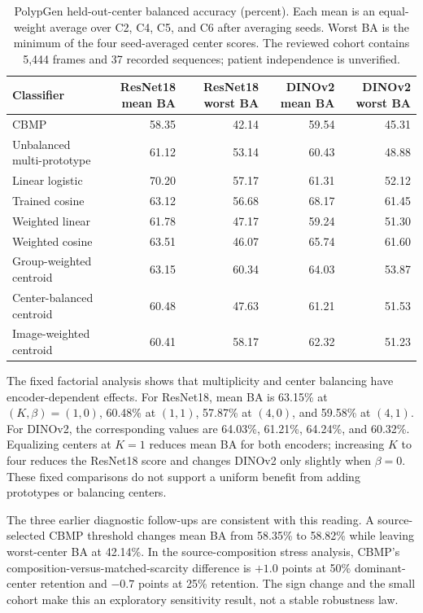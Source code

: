 \begin{table}[t]
\centering\small
\setlength{\tabcolsep}{5pt}
\begin{tabular}{lrrrr}
\hline
Classifier & ResNet18 mean BA & ResNet18 worst BA & DINOv2 mean BA & DINOv2 worst BA \\
\hline
CBMP & 58.35 & 42.14 & 59.54 & 45.31 \\
Unbalanced multi-prototype & 61.12 & 53.14 & 60.43 & 48.88 \\
Linear logistic & 70.20 & 57.17 & 61.31 & 52.12 \\
Trained cosine & 63.12 & 56.68 & 68.17 & 61.45 \\
Weighted linear & 61.78 & 47.17 & 59.24 & 51.30 \\
Weighted cosine & 63.51 & 46.07 & 65.74 & 61.60 \\
Group-weighted centroid & 63.15 & 60.34 & 64.03 & 53.87 \\
Center-balanced centroid & 60.48 & 47.63 & 61.21 & 51.53 \\
Image-weighted centroid & 60.41 & 58.17 & 62.32 & 51.23 \\
\hline
\end{tabular}
\caption{PolypGen held-out-center balanced accuracy (percent). Each mean is an equal-weight average over C2, C4, C5, and C6 after averaging seeds. Worst BA is the minimum of the four seed-averaged center scores. The reviewed cohort contains 5,444 frames and 37 recorded sequences; patient independence is unverified.}
\label{tab:polypgen_results}
\end{table}

The fixed factorial analysis shows that multiplicity and center balancing have encoder-dependent effects. For ResNet18, mean BA is 63.15\% at $(K,\beta)=(1,0)$, 60.48\% at $(1,1)$, 57.87\% at $(4,0)$, and 59.58\% at $(4,1)$. For DINOv2, the corresponding values are 64.03\%, 61.21\%, 64.24\%, and 60.32\%. Equalizing centers at $K=1$ reduces mean BA for both encoders; increasing $K$ to four reduces the ResNet18 score and changes DINOv2 only slightly when $\beta=0$. These fixed comparisons do not support a uniform benefit from adding prototypes or balancing centers.

The three earlier diagnostic follow-ups are consistent with this reading. A source-selected CBMP threshold changes mean BA from 58.35\% to 58.82\% while leaving worst-center BA at 42.14\%. In the source-composition stress analysis, CBMP's composition-versus-matched-scarcity difference is $+1.0$ points at 50\% dominant-center retention and $-0.7$ points at 25\% retention. The sign change and the small cohort make this an exploratory sensitivity result, not a stable robustness law.

